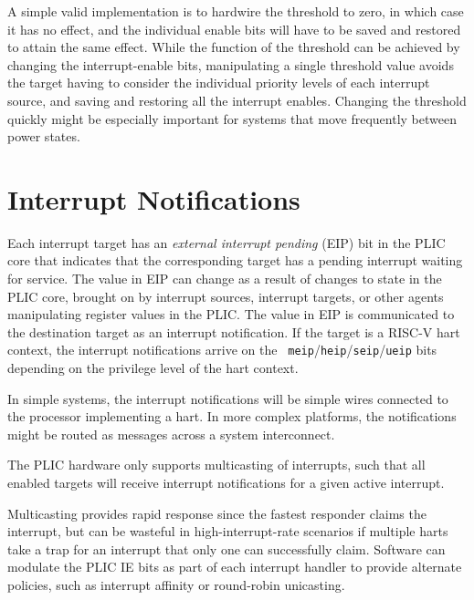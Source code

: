 \begin{commentary}
A simple valid implementation is to hardwire the threshold to zero, in
which case it has no effect, and the individual enable bits will have
to be saved and restored to attain the same effect.  While the
function of the threshold can be achieved by changing the
interrupt-enable bits, manipulating a single threshold value avoids
the target having to consider the individual priority levels of each
interrupt source, and saving and restoring all the interrupt enables.
Changing the threshold quickly might be especially important for
systems that move frequently between power states.
\end{commentary}

\section{Interrupt Notifications}

Each interrupt target has an {\em external interrupt pending} (EIP)
bit in the PLIC core that indicates that the corresponding target has
a pending interrupt waiting for service.  The value in EIP can change
as a result of changes to state in the PLIC core, brought on by
interrupt sources, interrupt targets, or other agents manipulating
register values in the PLIC.  The value in EIP is communicated to the
destination target as an interrupt notification.  If the target is a
RISC-V hart context, the interrupt notifications arrive on the {\tt
  meip}/{\tt heip}/{\tt seip}/{\tt ueip} bits depending on the
privilege level of the hart context.

\begin{commentary}
In simple systems, the interrupt notifications will be simple wires
connected to the processor implementing a hart.  In more complex
platforms, the notifications might be routed as messages across a
system interconnect.
\end{commentary}

The PLIC hardware only supports multicasting of interrupts, such that
all enabled targets will receive interrupt notifications for a given
active interrupt.

\begin{commentary}
Multicasting provides rapid response since the fastest responder
claims the interrupt, but can be wasteful in high-interrupt-rate
scenarios if multiple harts take a trap for an interrupt that only one
can successfully claim.  Software can modulate the PLIC IE bits as
part of each interrupt handler to provide alternate policies, such as
interrupt affinity or round-robin unicasting.
\end{commentary}

